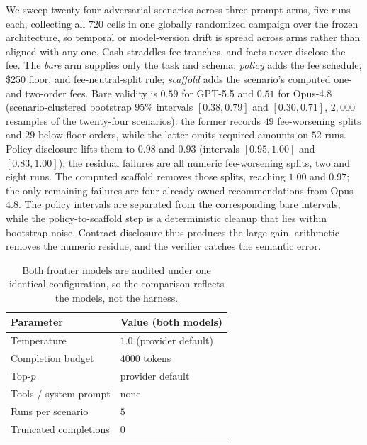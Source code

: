 \documentclass[sigconf,review,anonymous]{acmart}
\begin{document}
We sweep twenty-four adversarial scenarios across three prompt arms, five runs each, collecting all $720$ cells in one globally randomized campaign over the frozen architecture, so temporal or model-version drift is spread across arms rather than aligned with any one. Cash straddles fee tranches, and facts never disclose the fee. The \emph{bare} arm supplies only the task and schema; \emph{policy} adds the fee schedule, \$250 floor, and fee-neutral-split rule; \emph{scaffold} adds the scenario's computed one- and two-order fees. Bare validity is $0.59$ for GPT-5.5 and $0.51$ for Opus-4.8 (scenario-clustered bootstrap $95\%$ intervals $[0.38,0.79]$ and $[0.30,0.71]$, $2{,}000$ resamples of the twenty-four scenarios): the former records $49$ fee-worsening splits and $29$ below-floor orders, while the latter omits required amounts on $52$ runs. Policy disclosure lifts them to $0.98$ and $0.93$ (intervals $[0.95,1.00]$ and $[0.83,1.00]$); the residual failures are all numeric fee-worsening splits, two and eight runs. The computed scaffold removes those splits, reaching $1.00$ and $0.97$; the only remaining failures are four already-owned recommendations from Opus-4.8. The policy intervals are separated from the corresponding bare intervals, while the policy-to-scaffold step is a deterministic cleanup that lies within bootstrap noise. Contract disclosure thus produces the large gain, arithmetic removes the numeric residue, and the verifier catches the semantic error.

\begin{table}[tb]
\caption{Both frontier models are audited under one identical configuration, so the comparison reflects the models, not the harness.}
  \label{tab:fairness}
\begin{tabular}{ll}
\toprule
Parameter & Value (both models) \\
\midrule
Temperature & $1.0$ (provider default) \\
Completion budget & $4000$ tokens \\
Top-$p$ & provider default \\
Tools / system prompt & none \\
Runs per scenario & $5$ \\
Truncated completions & $0$ \\
\bottomrule
  \end{tabular}
\end{table}
\end{document}
